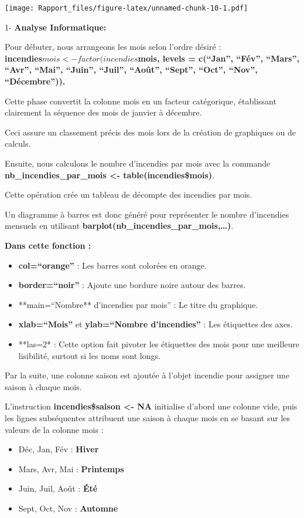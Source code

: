 \documentclass[
]{article}
\providecommand{\tightlist}{%
  \setlength{\itemsep}{0pt}\setlength{\parskip}{0pt}}
\begin{document}
\texttt{[image: Rapport\_files/figure-latex/unnamed-chunk-10-1.pdf]}

1- \textbf{Analyse Informatique:}

Pour débuter, nous arrangeons les mois selon l'ordre désiré :\\
\textbf{incendies\(mois <- factor(incendies\)mois, levels = c(``Jan'',
``Fév'', ``Mars'', ``Avr'', ``Mai'', ``Juin'', ``Juil'', ``Août'',
``Sept'', ``Oct'', ``Nov'', ``Décembre'')).}

Cette phase convertit la colonne mois en un facteur catégorique,
établissant clairement la séquence des mois de janvier à décembre.

Ceci assure un classement précis des mois lors de la création de
graphiques ou de calculs.

Ensuite, nous calculons le nombre d'incendies par mois avec la commande
\textbf{nb\_incendies\_par\_mois \textless- table(incendies\$mois)}.

Cette opération crée un tableau de décompte des incendies par mois.

Un diagramme à barres est donc généré pour représenter le nombre
d'incendies mensuels en utilisant
\textbf{barplot(nb\_incendies\_par\_mois,\ldots)}.

\textbf{Dans cette fonction :}

\begin{itemize}
\tightlist
\item
  \textbf{col=``orange''} : Les barres sont colorées en orange.
\item
  \textbf{border=``noir''} : Ajoute une bordure noire autour des barres.
\item
  **main=``Nombre** d'incendies par mois'' : Le titre du graphique.
\item
  \textbf{xlab=``Mois''} et \textbf{ylab=``Nombre d'incendies''} : Les
  étiquettes des axes.
\item
  **las=2* : Cette option fait pivoter les étiquettes des mois pour une
  meilleure lisibilité, surtout si les noms sont longs.
\end{itemize}

Par la suite, une colonne saison est ajoutée à l'objet incendie pour
assigner une saison à chaque mois.

L'instruction \textbf{incendies\$saison \textless- NA} initialise
d'abord une colonne vide, puis les lignes subséquentes attribuent une
saison à chaque mois en se basant sur les valeurs de la colonne mois :

\begin{itemize}
\tightlist
\item
  Déc, Jan, Fév : \textbf{Hiver}
\item
  Mars, Avr, Mai : \textbf{Printemps}
\item
  Juin, Juil, Août : \textbf{Été}
\item
  Sept, Oct, Nov : \textbf{Automne}
\end{itemize}
\end{document}
